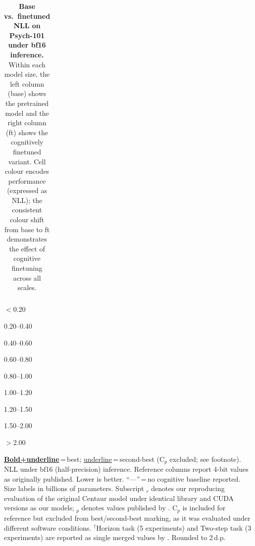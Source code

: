 \begin{table}
{{\begin{tabular}{@{}l l  r@{\;\;}r  r@{\;\;}r  r@{\;\;}r  r@{\;\;}r  r@{\;\;}r  r@{\;\;}r  r@{\;\;}r  r@{\;\;}r  r  r  r  r  r@{}}
\bottomrule
\end{tabular}%
}
}%
\setlength{\ctrtblwd}{\wd\ctrtblbox}%
\ifdim\ctrtblwd>\dimexpr\textheight-8pt\relax
  \setlength{\ctrtblwd}{\dimexpr\textheight-8pt\relax}%
\fi
\resizebox{\ctrtblwd}{!}{\usebox{\ctrtblbox}}
\par
\begin{minipage}{\ctrtblwd}
\vspace{4pt}
\begin{center}\footnotesize
\colorbox{c1!45}{\strut\hspace{5pt}} \scriptsize$<$0.20 \quad
\colorbox{c2!40}{\strut\hspace{5pt}} \scriptsize 0.20--0.40 \quad
\colorbox{c3!40}{\strut\hspace{5pt}} \scriptsize 0.40--0.60 \quad
\colorbox{c4!45}{\strut\hspace{5pt}} \scriptsize 0.60--0.80 \quad
\colorbox{c5!55}{\strut\hspace{5pt}} \scriptsize 0.80--1.00 \quad
\colorbox{c6!50}{\strut\hspace{5pt}} \scriptsize 1.00--1.20 \quad
\colorbox{c7!45}{\strut\hspace{5pt}} \scriptsize 1.20--1.50 \quad
\colorbox{c8!40}{\strut\hspace{5pt}} \scriptsize 1.50--2.00 \quad
\colorbox{c9!35}{\strut\hspace{5pt}} \scriptsize$>$2.00
\end{center}
\vspace{-2pt}
{\tiny \underline{\textbf{Bold+underline}}\,=\,best; \underline{underline}\,=\,second-best (C$_p$ excluded; see footnote). NLL under bf16 (half-precision) inference. Reference columns report 4-bit values as originally published. Lower is better. ``---''\,=\,no cognitive baseline reported. Size labels in billions of parameters. Subscript $_r$ denotes our reproducing evaluation of the original Centaur model under identical library and CUDA versions as our models; $_p$ denotes values published by \citet{binz2025foundation}. C$_p$ is included for reference but excluded from best/second-best marking, as it was evaluated under different software conditions. $^\dagger$Horizon task (5 experiments) and Two-step task (3 experiments) are reported as single merged values by \citet{binz2025foundation}. Rounded to 2\,d.p.}
\end{minipage}
\captionsetup{width=\ctrtblwd}
\caption{\textbf{Base vs.\ finetuned NLL on Psych-101 under bf16 inference.} Within each model size, the left column (base) shows the pretrained model and the right column (ft) shows the cognitively finetuned variant. Cell colour encodes performance (expressed as NLL); the consistent colour shift from base to ft demonstrates the effect of cognitive finetuning across all scales.}
\label{tab:psych101_pe_bf16_base_v_ft}
\end{table}

